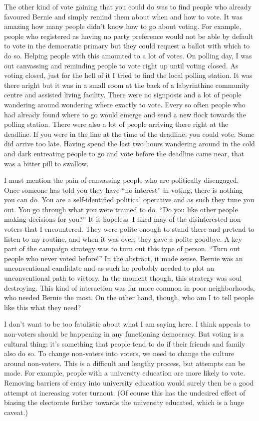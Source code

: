 \documentclass[]{book}
\begin{document}
The other kind of vote gaining that you could do was to find people who already favoured Bernie and simply remind them about when and how to vote. It was amazing how many people didn't know how to go about voting. For example, people who registered as having no party preference would not be able by default to vote in the democratic primary but they could request a ballot with which to do so. Helping people with this amounted to a lot of votes. On polling day, I was out canvassing and reminding people to vote right up until voting closed. As voting closed, just for the hell of it I tried to find the local polling station. It was there aright but it was in a small room at the back of a labyrinthine community centre and assisted living facility. There were no signposts and a lot of people wandering around wondering where exactly to vote. Every so often people who had already found where to go would emerge and send a new flock towards the polling station. There were also a lot of people arriving there right at the deadline. If you were in the line at the time of the deadline, you could vote. Some did arrive too late. Having spend the last two hours wandering around in the cold and dark entreating people to go and vote before the deadline came near, that was a bitter pill to swallow.

I must mention the pain of canvassing people who are politically disengaged. Once someone has told you they have ``no interest'' in voting, there is nothing you can do. You are a self-identified political operative and as such they tune you out. You go through what you were trained to do. ``Do you like other people making decisions for you?'' It is hopeless. I liked may of the disinterested non-voters that I encountered. They were polite enough to stand there and pretend to listen to my routine, and when it was over, they gave a polite goodbye. A key part of the campaign strategy was to turn out this type of person. ``Turn out people who never voted before!'' In the abstract, it made sense. Bernie was an unconventional candidate and as such he probably needed to plot an unconventional path to victory. In the moment though, this strategy was soul destroying. This kind of interaction was far more common in poor neighborhoods, who needed Bernie the most. On the other hand, though, who am I to tell people like this what they need?

I don't want to be too fatalistic about what I am saying here. I think appeals to non-voters should be happening in any functioning democracy. But voting is a cultural thing: it's something that people tend to do if their friends and family also do so. To change non-voters into voters, we need to change the culture around non-voters. This is a difficult and lengthy process, but attempts can be made. For example, people with a university education are more likely to vote. Removing barriers of entry into university education would surely then be a good attempt at increasing voter turnout. (Of course this has the undesired effect of biasing the electorate further towards the university educated, which is a huge caveat.)
\end{document}
